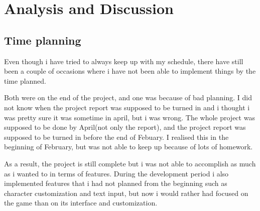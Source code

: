 \documentclass[a4paper,12pt]{article}
\begin{document}
\section{Analysis and Discussion}

\subsection{Time planning}

Even though i have tried to always keep up with my schedule, there have still been a couple of occasions where i have not been able to implement things by the time planned.

Both were on the end of the project, and one was because of bad planning.
I did not know when the project report was supposed to be turned in and i thought i was pretty sure it was sometime in april, but i was wrong. 
The whole project was supposed to be done by April(not only the report), and the project report was supposed to be turned in before the end of Febuary. I realised this in the beginning of February, but was not able to keep up because of lots of homework.

As a result, the project is still complete but i was not able to accomplish as much as i wanted to in terms of features.
During the development period i also implemented features that i had not planned from the beginning such as character customization and text input, but now i would rather had focused on the game than on its interface and customization.
\\
\end{document}
